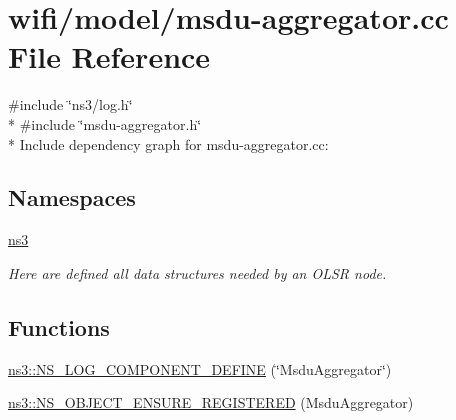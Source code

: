 \hypertarget{msdu-aggregator_8cc}{}\section{wifi/model/msdu-\/aggregator.cc File Reference}
\label{msdu-aggregator_8cc}
{\ttfamily \#include \char`\"{}ns3/log.\+h\char`\"{}}\\*
{\ttfamily \#include \char`\"{}msdu-\/aggregator.\+h\char`\"{}}\\*
Include dependency graph for msdu-\/aggregator.cc\+:
\subsection*{Namespaces}
\begin{DoxyCompactItemize}
\item 
 \hyperlink{namespacens3}{ns3}
\begin{DoxyCompactList}\small\item\em Here are defined all data structures needed by an O\+L\+SR node. \end{DoxyCompactList}\end{DoxyCompactItemize}
\subsection*{Functions}
\begin{DoxyCompactItemize}
\item 
\hyperlink{namespacens3_a8ce18ec50b2e6090aa00e3b3db7f598b}{ns3\+::\+N\+S\+\_\+\+L\+O\+G\+\_\+\+C\+O\+M\+P\+O\+N\+E\+N\+T\+\_\+\+D\+E\+F\+I\+NE} (\char`\"{}Msdu\+Aggregator\char`\"{})
\item 
\hyperlink{namespacens3_a893fbde503ad6ef07b3c719ccb49313b}{ns3\+::\+N\+S\+\_\+\+O\+B\+J\+E\+C\+T\+\_\+\+E\+N\+S\+U\+R\+E\+\_\+\+R\+E\+G\+I\+S\+T\+E\+R\+ED} (Msdu\+Aggregator)
\end{DoxyCompactItemize}
